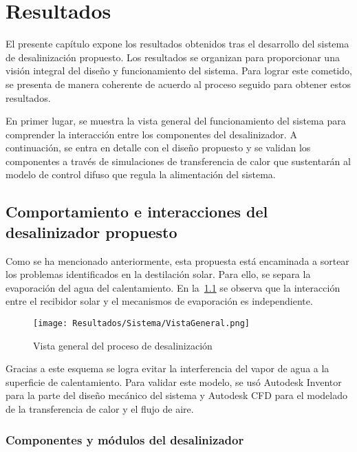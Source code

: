 \chapter{Resultados}

	El presente capítulo expone los resultados obtenidos tras el desarrollo del sistema de desalinización propuesto. Los resultados se organizan para proporcionar una visión integral del diseño y funcionamiento del sistema. Para lograr este cometido, se presenta de manera coherente de acuerdo al proceso seguido para obtener estos resultados.
	
	En primer lugar, se muestra la vista general del funcionamiento del sistema para comprender la interacción entre los componentes del desalinizador. A continuación, se entra en detalle con el diseño propuesto y se validan los componentes a través de simulaciones de transferencia de calor que sustentarán al modelo de control difuso que regula la alimentación del sistema.

	
	\section{Comportamiento e interacciones del desalinizador propuesto}
	
		Como se ha mencionado anteriormente, esta propuesta está encaminada a sortear los problemas identificados en la destilación solar. Para ello, se separa la evaporación del agua del calentamiento. En la~\cref{fig:VistaGeneral} se observa que la interacción entre el recibidor solar y el mecanismos de evaporación es independiente.
	
		\begin{figure}
			\centering
			\texttt{[image: Resultados/Sistema/VistaGeneral.png]}
			\caption{Vista general del proceso de desalinización}
			\label{fig:VistaGeneral}
		\end{figure}
		
		Gracias a este esquema se logra evitar la interferencia del vapor de agua a la superficie de calentamiento. Para validar este modelo, se usó Autodesk Inventor para la parte del diseño mecánico del sistema y Autodesk CFD para el modelado de la transferencia de calor y el flujo de aire.
	
		
	
		\subsection{Componentes y módulos del desalinizador}
			
